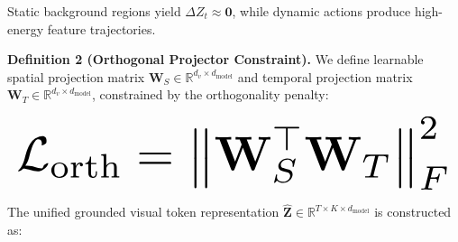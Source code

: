 \documentclass{article}
\begin{document}
Static background regions yield $\Delta Z_t \approx \mathbf{0}$, while dynamic actions produce high-energy feature trajectories.

\textbf{Definition 2 (Orthogonal Projector Constraint).} We define learnable spatial projection matrix $\mathbf{W}_S \in \mathbb{R}^{d_v \times d_{\text{model}}}$ and temporal projection matrix $\mathbf{W}_T \in \mathbb{R}^{d_v \times d_{\text{model}}}$, constrained by the orthogonality penalty:

























\begin{equation}
\resizebox{\columnwidth}{!}{$\displaystyle
\begin{aligned}
\mathcal{L}_{\text{orth}} = \left\| \mathbf{W}_S^\top \mathbf{W}_T \right\|_F^2
\end{aligned}
$}
\end{equation}

























The unified grounded visual token representation $\hat{\mathbf{Z}} \in \mathbb{R}^{T \times K \times d_{\text{model}}}$ is constructed as:
\end{document}
